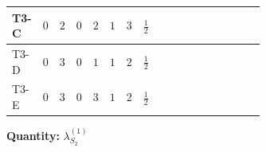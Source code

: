 \documentclass[8pt]{article}
\begin{document}
\begin{landscape}
\begin{longtable}{@{}llcccccc >{\raggedright\arraybackslash}p{0.21\linewidth} >{\raggedright\arraybackslash}p{0.21\linewidth} >{\raggedright\arraybackslash}p{0.21\linewidth}@{}}
\midrule
T3-C & $0$ & $2$ & $0$ & $2$ & $1$ & $3$ & $\frac{1}{2}$ & \scriptsize\adjustbox{max width=\linewidth}{$\begin{gathered} +12 {g_1}^4\end{gathered}$} & \scriptsize\adjustbox{max width=\linewidth}{$\begin{gathered} +4 {\lambda_{12}^{(1)}}^2\end{gathered}$} & \scriptsize\adjustbox{max width=\linewidth}{$\begin{gathered} +4 {\lambda_{HS_2}^{(1)}}^2\end{gathered}$} \\
\midrule
T3-D & $0$ & $3$ & $0$ & $1$ & $1$ & $2$ & $\frac{1}{2}$ & \scriptsize\adjustbox{max width=\linewidth}{$\begin{gathered} +12 {g_1}^4\end{gathered}$} & \scriptsize\adjustbox{max width=\linewidth}{$\begin{gathered} +6 {\lambda_{12}^{(1)}}^2\end{gathered}$} & \scriptsize\adjustbox{max width=\linewidth}{$\begin{gathered} +4 {\lambda_{HS_2}^{(1)}}^2\end{gathered}$} \\
\midrule
T3-E & $0$ & $3$ & $0$ & $3$ & $1$ & $2$ & $\frac{1}{2}$ & \scriptsize\adjustbox{max width=\linewidth}{$\begin{gathered} +12 {g_1}^4\end{gathered}$} & \scriptsize\adjustbox{max width=\linewidth}{$\begin{gathered} +6 {\lambda_{12}^{(1)}}^2\end{gathered}$} & \scriptsize\adjustbox{max width=\linewidth}{$\begin{gathered} +4 {\lambda_{HS_2}^{(1)}}^2\end{gathered}$} \\
\midrule
\bottomrule
\end{longtable}
\clearpage
\noindent\textbf{Quantity: }$\lambda_{S_2}^{(1)}$\par\smallskip

\end{landscape}
\end{document}
